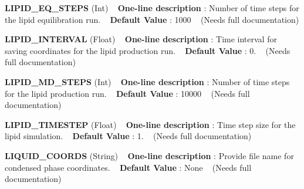 \begin{DoxyItemize}
\item {\bfseries  L\+I\+P\+I\+D\+\_\+\+E\+Q\+\_\+\+S\+T\+E\+PS } (Int) ~\newline
{\bfseries  One-\/line description }\+: Number of time steps for the lipid equilibration run. ~\newline
{\bfseries  Default Value }\+: 1000 ~\newline
(Needs full documentation)\end{DoxyItemize}
\begin{DoxyItemize}
\item {\bfseries  L\+I\+P\+I\+D\+\_\+\+I\+N\+T\+E\+R\+V\+AL } (Float) ~\newline
{\bfseries  One-\/line description }\+: Time interval for saving coordinates for the lipid production run. ~\newline
{\bfseries  Default Value }\+: 0. ~\newline
(Needs full documentation)\end{DoxyItemize}
\begin{DoxyItemize}
\item {\bfseries  L\+I\+P\+I\+D\+\_\+\+M\+D\+\_\+\+S\+T\+E\+PS } (Int) ~\newline
{\bfseries  One-\/line description }\+: Number of time steps for the lipid production run. ~\newline
{\bfseries  Default Value }\+: 10000 ~\newline
(Needs full documentation)\end{DoxyItemize}
\begin{DoxyItemize}
\item {\bfseries  L\+I\+P\+I\+D\+\_\+\+T\+I\+M\+E\+S\+T\+EP } (Float) ~\newline
{\bfseries  One-\/line description }\+: Time step size for the lipid simulation. ~\newline
{\bfseries  Default Value }\+: 1. ~\newline
(Needs full documentation)\end{DoxyItemize}
\begin{DoxyItemize}
\item {\bfseries  L\+I\+Q\+U\+I\+D\+\_\+\+C\+O\+O\+R\+DS } (String) ~\newline
{\bfseries  One-\/line description }\+: Provide file name for condensed phase coordinates. ~\newline
{\bfseries  Default Value }\+: None ~\newline
(Needs full documentation)\end{DoxyItemize}
